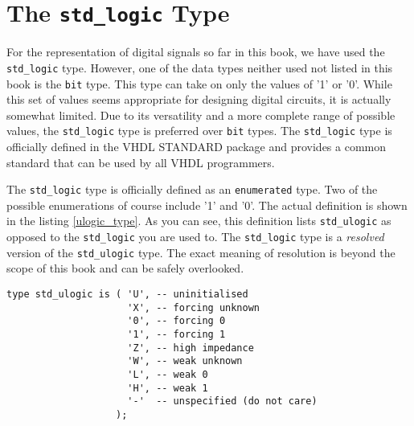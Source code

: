 \section{The \texttt{std\_logic} Type}
For the representation of digital signals so far in this book, we have used the \texttt{std\_logic} type. However, one of the data types neither used not listed in this book is the \texttt{bit} type. This type can take on only the values of '1' or '0'. While this set of values seems appropriate for designing digital circuits, it is actually somewhat limited. Due to its versatility and a more complete range of possible values, the \texttt{std\_logic} type is preferred over \texttt{bit} types. The \texttt{std\_logic} type is officially defined in the VHDL STANDARD package and provides a common standard that can be used by all VHDL programmers.

The \texttt{std\_logic} type is officially defined as an \texttt{enumerated} type. Two of the possible enumerations of course include '1' and '0'. The actual definition is shown in the listing \ref{ulogic_type}. As you can see, this definition lists \texttt{std\_ulogic} as opposed to the \texttt{std\_logic} you are used to. The \texttt{std\_logic} type is a \textit{resolved} version of the \texttt{std\_ulogic} type. The exact meaning of resolution is beyond the scope of this book and can be safely overlooked. 

\begin{lstlisting}[label=ulogic_type, caption=Declaration of the \texttt{std\_ulogic} enumerated type.]
type std_ulogic is ( 'U', -- uninitialised 
                     'X', -- forcing unknown
                     '0', -- forcing 0
                     '1', -- forcing 1
                     'Z', -- high impedance
                     'W', -- weak unknown
                     'L', -- weak 0
                     'H', -- weak 1
                     '-'  -- unspecified (do not care) 
                   );
\end{lstlisting}

